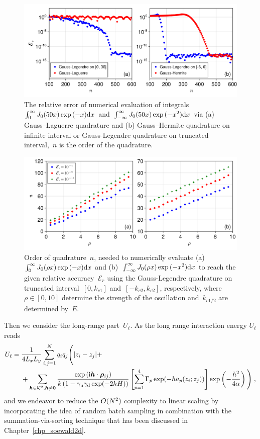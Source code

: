 \begin{figure}[htbp]
    \centering
    \includegraphics[width = \linewidth]{figs/integral_n.pdf}
    \caption{
        The relative error of numerical evaluation of integrals~$\int_0^{\infty} J_0(50 x) \exp{(-x)} \mathrm{d}x$ and~$\int_{-\infty}^{\infty} J_0(50 x) \exp{(-x^2)} \mathrm{d}x$ via (a) Gauss–Laguerre quadrature and (b) Gauss–Hermite quadrature on infinite interval or Gauss-Legendre quadrature on truncated interval,~$n$ is the order of the quadrature.
    }
    \label{fig:Gauss_int}
\end{figure}

\begin{figure}[htbp]
    \centering
    \includegraphics[width = \linewidth]{figs/integral_r.pdf}
    \caption{
    Order of quadrature~$n$, needed to numerically evaluate (a)~$\int_0^{\infty} J_0(\rho x) \exp{(-x)} \mathrm{d}x$ and (b)~$\int_{-\infty}^{\infty} J_0(\rho x) \exp{(-x^2)} \mathrm{d}x$ to reach the given relative accuracy~$\mathcal{E}_r$ using the Gauss-Legendre quadrature on truncated interval~$[0, k_{c1}]$ and~$[-k_{c2}, k_{c2}]$, respectively, where~$\rho \in [0, 10]$ determine the strength of the oscillation and~$k_{c1/2}$ are determined by~$E$.
    }
    \label{fig:Gauss_int_n}
\end{figure}

Then we consider the long-range part~$U_\ell$.
As the long range interaction  energy $U_\ell$ reads
\begin{align*} 
U_\ell&=\frac{1}{4  L_xL_y}\sum_{i,j=1}^N q_iq_j\Bigg({\left\lvert z_i-z_j\right\rvert} +\\&~~~~+  \sum_{\boldsymbol{h}\in\mathcal{K}^2,\boldsymbol{h}\neq\bm{0}} \frac{ \exp{(\mathrm{i} \boldsymbol{h} \cdot \boldsymbol{\rho}_{ij})}}{k\left(1-\gamma_{\mathrm{u}}\gamma_{\mathrm{d}}\exp(-2hH)\right)}\left[\sum_{p=1}^4\Gamma_p\exp(-ha_p(z_i;z_j))\right] \exp\left(-\frac{h^2}{4\alpha}\right)\Bigg)\;,
\end{align*}
and we endeavor to  reduce the $O(N^2)$ complexity to linear scaling by incorporating the idea of random batch sampling in combination with the summation-via-sorting technique that has been discussed in Chapter~\ref{chp_soewald2d}.


